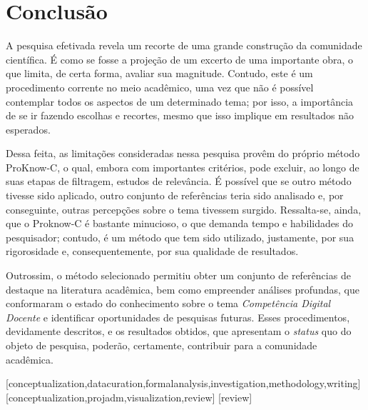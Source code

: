 \documentclass[portuguese]{textolivre}
\begin{document}
\section{Conclusão}

A pesquisa efetivada revela um recorte de uma grande construção da comunidade científica. É como se fosse a projeção de um excerto de uma importante obra, o que limita, de certa forma, avaliar sua magnitude. Contudo, este é um procedimento corrente no meio acadêmico, uma vez que não é possível contemplar todos os aspectos de um determinado tema; por isso, a importância de se ir fazendo escolhas e recortes, mesmo que isso implique em resultados não esperados.

Dessa feita, as limitações consideradas nessa pesquisa provêm do próprio método ProKnow-C, o qual, embora com importantes critérios, pode excluir, ao longo de suas etapas de filtragem, estudos de relevância. É possível que se outro método tivesse sido aplicado, outro conjunto de referências teria sido analisado e, por conseguinte, outras percepções sobre o tema tivessem surgido. Ressalta-se, ainda, que o Proknow-C é bastante minucioso, o que demanda tempo e habilidades do pesquisador; contudo, é um método que tem sido utilizado, justamente, por sua rigorosidade e, consequentemente, por sua qualidade de resultados.

Outrossim, o método selecionado permitiu obter um conjunto de referências de destaque na literatura acadêmica, bem como empreender análises profundas, que conformaram o estado do conhecimento sobre o tema \textit{Competência Digital Docente} e identificar oportunidades de pesquisas futuras. Esses procedimentos, devidamente descritos, e os resultados obtidos, que apresentam o \textit{status} quo do objeto de pesquisa, poderão, certamente, contribuir para a comunidade acadêmica.


\printbibliography\label{sec-bib}


\begin{contributors}
[conceptualization,datacuration,formalanalysis,investigation,methodology,writing]
[conceptualization,projadm,visualization,review]
[review]
\end{contributors}
\end{document}
